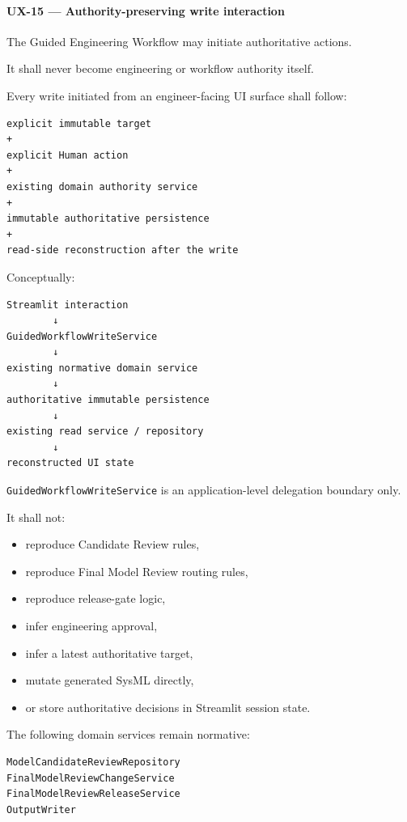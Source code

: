 \hypertarget{ux-15--authority-preserving-write-interaction}{%
\paragraph{UX-15 --- Authority-preserving write interaction}\label{ux-15--authority-preserving-write-interaction}}

The Guided Engineering Workflow may initiate authoritative actions.

It shall never become engineering or workflow authority itself.

Every write initiated from an engineer-facing UI surface shall follow:

\begin{verbatim}
explicit immutable target
+
explicit Human action
+
existing domain authority service
+
immutable authoritative persistence
+
read-side reconstruction after the write
\end{verbatim}

Conceptually:

\begin{verbatim}
Streamlit interaction
        ↓
GuidedWorkflowWriteService
        ↓
existing normative domain service
        ↓
authoritative immutable persistence
        ↓
existing read service / repository
        ↓
reconstructed UI state
\end{verbatim}

\texttt{GuidedWorkflowWriteService} is an application-level delegation boundary only.

It shall not:

\begin{itemize}
\tightlist
\item
  reproduce Candidate Review rules,
\item
  reproduce Final Model Review routing rules,
\item
  reproduce release-gate logic,
\item
  infer engineering approval,
\item
  infer a latest authoritative target,
\item
  mutate generated SysML directly,
\item
  or store authoritative decisions in Streamlit session state.
\end{itemize}

The following domain services remain normative:

\begin{verbatim}
ModelCandidateReviewRepository
FinalModelReviewChangeService
FinalModelReviewReleaseService
OutputWriter
\end{verbatim}

